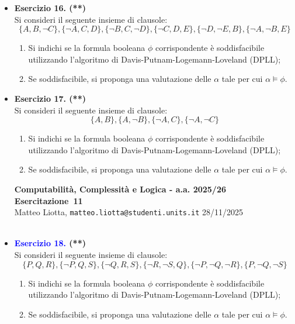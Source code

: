 \documentclass[a4paper,10pt]{article}
\makeatletter
\newcommand{\EsercitazioneNum}{11}
\newcommand{\Data}{28/11/2025}
\newcommand{\DocType}{Esercitazione} %
\newcommand{\FullTitle}{\DocType\ \EsercitazioneNum}
\newcommand{\Header}{
\noindent
  \small \textbf{Computabilità, Complessità e Logica - a.a. 2025/26} \hfill \textbf{\FullTitle} \\[0.2cm]
  \scriptsize Matteo Liotta, \texttt{matteo.liotta@studenti.units.it} \hfill \Data \\[0.2cm]
  \noindent\makebox[\linewidth]{\rule{\linewidth}{0.4pt}} \\[0.3cm]}
\newcommand{\NewPageHeader}{
  \vfill
  \noindent\makebox[\linewidth]{\rule{\linewidth}{0.4pt}}
  \newpage
  {\Header}
}
\makeatother
\begin{document}
{\begin{itemize}[label=, leftmargin=0pt]
    \item \textbf{Esercizio 16. (**)}\\ 	
    Si consideri il seguente insieme di clausole:
    $$\{A, B, \lnot C\}, \{\lnot A, C, D\}, \{\lnot B, C, \lnot D\}, \{\lnot C, D, E\}, \{\lnot D, \lnot E, B\}, \{\lnot A, \lnot B, E\}$$
    \begin{enumerate}
        \item Si indichi se la formula booleana $\phi$ corrispondente è soddisfacibile utilizzando l'algoritmo di Davis-Putnam-Logemann-Loveland (DPLL);
        \item Se soddisfacibile, si proponga una valutazione delle  $\alpha$ tale per cui $\alpha\models\phi$.
    \end{enumerate}

    \item \textbf{Esercizio 17. (**)}\\ 	
    Si consideri il seguente insieme di clausole:
    $$\{A, B\}, \{A, \neg B\}, \{\neg A, C\}, \{\neg A, \neg C\}$$
    \begin{enumerate}
        \item Si indichi se la formula booleana $\phi$ corrispondente è soddisfacibile utilizzando l'algoritmo di Davis-Putnam-Logemann-Loveland (DPLL);
        \item Se soddisfacibile, si proponga una valutazione delle  $\alpha$ tale per cui $\alpha\models\phi$.\\[0.2cm]
    \end{enumerate}

    \NewPageHeader

    \item \textbf{\textcolor{blue}{Esercizio 18.} (**)}\\ 	
    Si consideri il seguente insieme di clausole:
    $$\{P, Q, R\}, \{\lnot P, Q, S\}, \{\lnot Q, R, S\}, \{\lnot R, \lnot S, Q\}, \{\lnot P, \lnot Q, \lnot R\}, \{P, \lnot Q, \lnot S\}$$
    \begin{enumerate}
        \item Si indichi se la formula booleana $\phi$ corrispondente è soddisfacibile utilizzando l'algoritmo di Davis-Putnam-Logemann-Loveland (DPLL);
        \item Se soddisfacibile, si proponga una valutazione delle  $\alpha$ tale per cui $\alpha\models\phi$.
    \end{enumerate}


\end{itemize}}
\end{document}
